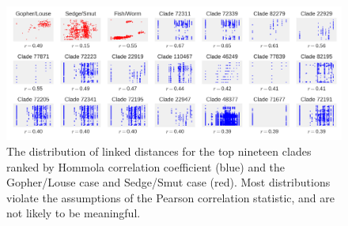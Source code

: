 \begin{figure}
    \includegraphics[width=\textwidth]{figures/High_correlation_clades.png}
    \caption{The distribution of linked distances for the top nineteen clades ranked by Hommola correlation coefficient (blue) and the Gopher/Louse case and Sedge/Smut case (red). Most distributions violate the assumptions of the Pearson correlation statistic, and are not likely to be meaningful. }
    \label{FP_highcorr}
\end{figure}
